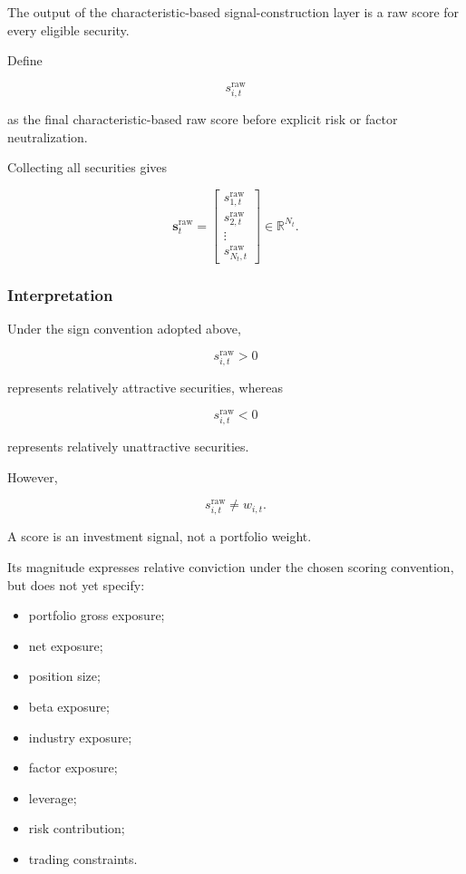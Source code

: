 \documentclass[11pt,a4paper]{article}
\begin{document}
The output of the characteristic-based signal-construction layer is a raw score
for every eligible security.

Define

\begin{equation}
\boxed{
s_{i,t}^{\mathrm{raw}}
}
\end{equation}

as the final characteristic-based raw score before explicit risk or factor
neutralization.

Collecting all securities gives

\begin{equation}
\boxed{
\mathbf{s}_t^{\mathrm{raw}}
=
\begin{bmatrix}
s_{1,t}^{\mathrm{raw}}
\\
s_{2,t}^{\mathrm{raw}}
\\
\vdots
\\
s_{N_t,t}^{\mathrm{raw}}
\end{bmatrix}
\in
\mathbb{R}^{N_t}.
}
\end{equation}


\subsubsection{Interpretation}

Under the sign convention adopted above,

\begin{equation}
s_{i,t}^{\mathrm{raw}}>0
\end{equation}

represents relatively attractive securities, whereas

\begin{equation}
s_{i,t}^{\mathrm{raw}}<0
\end{equation}

represents relatively unattractive securities.

However,

\begin{equation}
\boxed{
s_{i,t}^{\mathrm{raw}}
\neq
w_{i,t}.
}
\end{equation}

A score is an investment signal, not a portfolio weight.

Its magnitude expresses relative conviction under the chosen scoring
convention, but does not yet specify:

\begin{itemize}
    \item portfolio gross exposure;
    \item net exposure;
    \item position size;
    \item beta exposure;
    \item industry exposure;
    \item factor exposure;
    \item leverage;
    \item risk contribution;
    \item trading constraints.
\end{itemize}
\end{document}

